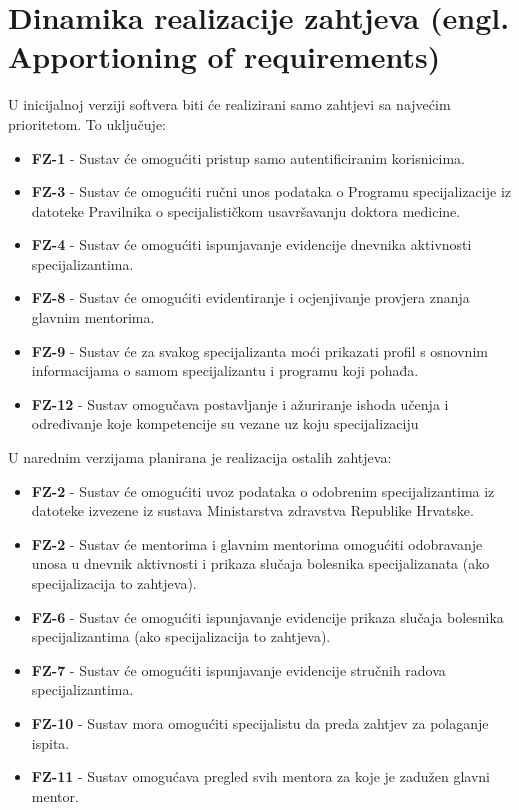 \documentclass{scrreprt}
\begin{document}
\section{Dinamika realizacije zahtjeva (engl. Apportioning of requirements)}
U inicijalnoj verziji softvera biti će realizirani samo zahtjevi sa najvećim prioritetom. To uključuje:
\begin{itemize}
    \item[] \textbf{FZ-1} - Sustav će omogućiti pristup samo autentificiranim korisnicima.
    \item[] \textbf{FZ-3} - Sustav će omogućiti ručni unos podataka o Programu specijalizacije iz datoteke Pravilnika o specijalističkom usavršavanju doktora medicine.
    \item[] \textbf{FZ-4} - Sustav će omogućiti ispunjavanje evidencije dnevnika aktivnosti specijalizantima.
    \item[] \textbf{FZ-8} - Sustav će omogućiti evidentiranje i ocjenjivanje provjera znanja glavnim mentorima.
    \item[] \textbf{FZ-9} - Sustav će za svakog specijalizanta moći prikazati profil s osnovnim informacijama o samom specijalizantu i programu koji pohađa.
    \item[] \textbf{FZ-12} - Sustav omogučava postavljanje i ažuriranje ishoda učenja i određivanje koje kompetencije su vezane uz koju specijalizaciju\\
\end{itemize}

U narednim verzijama planirana je realizacija ostalih zahtjeva:
\begin{itemize}
    \item[] \textbf{FZ-2} - Sustav će omogućiti uvoz podataka o odobrenim specijalizantima iz datoteke izvezene iz sustava Ministarstva zdravstva Republike Hrvatske.
    \item[] \textbf{FZ-2} - Sustav će mentorima i glavnim mentorima omogućiti odobravanje unosa u dnevnik aktivnosti i prikaza slučaja bolesnika specijalizanata (ako specijalizacija to zahtjeva).
    \item[] \textbf{FZ-6} - Sustav će omogućiti ispunjavanje evidencije prikaza slučaja bolesnika specijalizantima (ako specijalizacija to zahtjeva).
    \item[] \textbf{FZ-7} - Sustav će omogućiti ispunjavanje evidencije stručnih radova specijalizantima.
    \item[] \textbf{FZ-10} - Sustav mora omogućiti specijalistu da preda zahtjev za polaganje ispita.
    \item[] \textbf{FZ-11} - Sustav omogućava pregled svih mentora za koje je zadužen glavni mentor.
\end{itemize}
\end{document}
